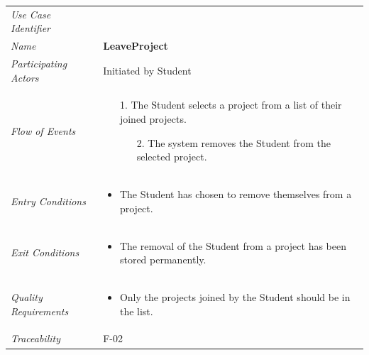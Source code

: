 \documentclass[12pt,letterpaper]{article}
\begin{document}
\begin{center}
	\begin{tabu} to 
		\toprule
		Use Case Identifier & \leaveproject{} \\
		Name & {\bf LeaveProject} \\
		Participating Actors & Initiated by Student \\
		Flow of Events & 
	    \begin{enumerate}[topsep=-1em, leftmargin=*]
		    \item[1.] The Student selects a project from a list of their joined projects.
		    \begin{enumerate}
		    		\item[2.] The system removes the Student from the selected project.
		    \end{enumerate}
		\end{enumerate} \\

		Entry Conditions &
		\begin{itemize}[topsep=-1em, leftmargin=*]
		    \item The Student has chosen to remove themselves from a project.
        \end{itemize} \\

		Exit Conditions &
		\begin{itemize}[topsep=-1em, leftmargin=*]
		    \item The removal of the Student from a project has been stored permanently.
        \end{itemize} \\

		Quality Requirements &
		\begin{itemize}[topsep=-1em, leftmargin=*]
		    \item Only the projects joined by the Student should be in the list.
        \end{itemize} \\

		Traceability & F-02 \\
		\toprule
	\end{tabu}
\end{center}
\end{document}
